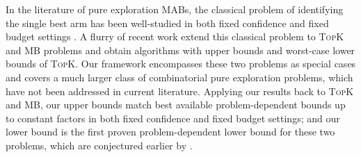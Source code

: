 \documentclass{article}
\newcommand{\MultiIdent}{\textsc{TopK}\xspace}
\newcommand{\MultiBandit}{\textsc{MB}\xspace}
\begin{document}
In the literature of pure exploration MABs, the classical problem of identifying the single best arm has been well-studied in both fixed confidence and fixed budget settings \citep{mannor2004sample,even2006action,bubeck2010pure,audibert2010best,gabillon2012best,jamieson2014best,jamieson2013lil}.
A flurry of recent work extend this classical problem to \MultiIdent and \MultiBandit problems and obtain algorithms with upper bounds \citep{kalyanakrishnan2010efficient,NIPS2011_4478,gabillon2012best,kalyanakrishnan2012pac,bubeck2013multiple,kaufmann2013information,zhou2014optimal} and worst-case lower bounds of \MultiIdent \citep{kalyanakrishnan2012pac,zhou2014optimal}.
Our framework encompasses these two problems as special cases and covers a much larger class of combinatorial pure exploration problems, which have not been addressed in current literature.
Applying our results back to \MultiIdent and \MultiBandit, our upper bounds match best available problem-dependent bounds up to constant factors \citep{gabillon2012best,kalyanakrishnan2012pac,bubeck2013multiple} in both fixed confidence and fixed budget settings; and our lower bound is the first proven problem-dependent lower bound for these two problems,
which are conjectured earlier by \citet{bubeck2013multiple}.

\vspace{-1em}
\end{document}
